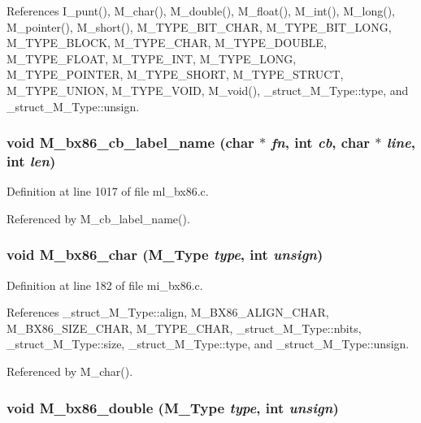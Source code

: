 References I\_\-punt(), M\_\-char(), M\_\-double(), M\_\-float(), M\_\-int(), M\_\-long(), M\_\-pointer(), M\_\-short(), M\_\-TYPE\_\-BIT\_\-CHAR, M\_\-TYPE\_\-BIT\_\-LONG, M\_\-TYPE\_\-BLOCK, M\_\-TYPE\_\-CHAR, M\_\-TYPE\_\-DOUBLE, M\_\-TYPE\_\-FLOAT, M\_\-TYPE\_\-INT, M\_\-TYPE\_\-LONG, M\_\-TYPE\_\-POINTER, M\_\-TYPE\_\-SHORT, M\_\-TYPE\_\-STRUCT, M\_\-TYPE\_\-UNION, M\_\-TYPE\_\-VOID, M\_\-void(), \_\-struct\_\-M\_\-Type::type, and \_\-struct\_\-M\_\-Type::unsign.
\subsubsection{\setlength{\rightskip}{0pt plus 5cm}void M\_\-bx86\_\-cb\_\-label\_\-name (char $\ast$ {\em fn}, int {\em cb}, char $\ast$ {\em line}, int {\em len})}\label{m__bx86_8h_ef7c5e1688e9b0fca9c6124593f7628d}




Definition at line 1017 of file ml\_\-bx86.c.

Referenced by M\_\-cb\_\-label\_\-name().
\subsubsection{\setlength{\rightskip}{0pt plus 5cm}void M\_\-bx86\_\-char (\bf{M\_\-Type} {\em type}, int {\em unsign})}\label{m__bx86_8h_7c70091e0d7c20d8c63151944fd1bb06}




Definition at line 182 of file mi\_\-bx86.c.

References \_\-struct\_\-M\_\-Type::align, M\_\-BX86\_\-ALIGN\_\-CHAR, M\_\-BX86\_\-SIZE\_\-CHAR, M\_\-TYPE\_\-CHAR, \_\-struct\_\-M\_\-Type::nbits, \_\-struct\_\-M\_\-Type::size, \_\-struct\_\-M\_\-Type::type, and \_\-struct\_\-M\_\-Type::unsign.

Referenced by M\_\-char().
\subsubsection{\setlength{\rightskip}{0pt plus 5cm}void M\_\-bx86\_\-double (\bf{M\_\-Type} {\em type}, int {\em unsign})}\label{m__bx86_8h_a72cd3e11d5646b837e6074c7af8dfba}




